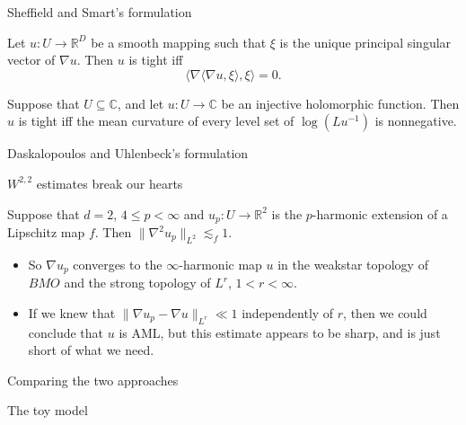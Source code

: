 \documentclass[10pt]{beamer}
\newcommand{\RR}{\mathbb{R}}
\newcommand{\CC}{\mathbb{C}}
\begin{document}
\begin{frame}{Sheffield and Smart's formulation}
\begin{theorem}
Let $u: U \to \RR^D$ be a smooth mapping such that $\xi$ is the unique principal singular vector of $\nabla u$.
Then $u$ is tight iff 
$$\langle \nabla \langle \nabla u, \xi\rangle, \xi\rangle = 0.$$
\end{theorem}

\begin{theorem}
Suppose that $U \subseteq \CC$, and let $u: U \to \CC$ be an injective holomorphic function.
Then $u$ is tight iff the mean curvature of every level set of $\log(Lu^{-1})$ is nonnegative.
\end{theorem}
    
\end{frame}

\begin{frame}{Daskalopoulos and Uhlenbeck's formulation}
    
\end{frame}

\begin{frame}{$W^{2, 2}$ estimates break our hearts}
\begin{theorem} 
Suppose that $d = 2$, $4 \leq p < \infty$ and $u_p: U \to \RR^2$ is the $p$-harmonic extension of a Lipschitz map $f$.
Then $\|\nabla^2 u_p\|_{L^2} \lesssim_f 1$.
\end{theorem}
 
\begin{itemize}
\item So $\nabla u_p$ converges to the $\infty$-harmonic map $u$ in the weakstar topology of $BMO$ and the strong topology of $L^r$, $1 < r < \infty$.  
\item If we knew that $\|\nabla u_p - \nabla u\|_{L^r} \ll 1$ independently of $r$, then we could conclude that $u$ is AML, but this estimate appears to be sharp, and is just short of what we need.
\end{itemize}

\end{frame}

\begin{frame}{Comparing the two approaches}
    
\end{frame}

\begin{frame}{The toy model}

\end{frame}
\end{document}
